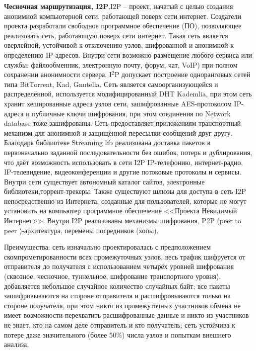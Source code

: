 \textbf{Чесночная маршрутизация, I2P}.I2P --  проект, начатый с целью создания анонимной компьютерной сети, работающей поверх сети интернет. Создатели проекта разработали свободное программное обеспечение (ПО), позволяющее реализовать сеть, работающую поверх сети интернет. Такая сеть является оверлейной, устойчивой к отключению узлов, шифрованной и анонимной к определению IP-адресов. Внутри сети возможно размещение любого сервиса или службы: файлообменник, электронную почту, форум, чат, VoIP) при полном сохранении анонимности сервера. I$ ^{2} $P допускает построение одноранговых сетей типа BitTorrent, Kad, Gnutella. %
Сеть является самоорганизующейся и распределённой, используется модифицированный DHT Kademlia, при этом сеть хранит хешированные адреса узлов сети, зашифрованные AES-протоколом IP-адреса и публичные ключи шифрования, при этом соединения по Network database тоже зашифрованы.	Сеть предоставляет приложениям транспортный механизм для анонимной и защищённой пересылки сообщений друг другу. %
Благодаря библиотеке Streaming lib реализована  доставка пакетов  в первоначально заданной последовательности без ошибок, потерь и дублирования, что даёт возможность использовать в сети I2P IP-телефонию, интернет-радио, IP-телевидение, видеоконференции и другие потоковые протоколы и сервисы. \cite{I2P1} %
Внутри сети  существует автономный каталог сайтов, электронные библиотеки,торрент-трекеры. Также существуют шлюзы для доступа в сеть I2P непосредственно из Интернета, созданные  для пользователей, которые  не могут установить на компьютер программное обеспечение <<Проекта Невидимый Интернет>>. Внутри I2P реализованы механизмы шифрования, P2P (peer to peer )-архитектура, перемены посредников (хопы).

Преимущества: сеть изначально проектировалась с предположением скомпрометированности  всех промежуточных узлов, \cite{I2P2} %
весь трафик шифруется от отправителя до получателя с использованием четырёх уровней шифрования (сквозное, чесночное, туннельное,  шифрование транспортного уровня), добавляется небольшое случайное количество случайных байт; все пакеты зашифровываются на стороне отправителя и расшифровываются только на стороне получателя, при этом никто из промежуточных участников обмена не имеет возможности перехватить расшифрованные данные и никто из участников не знает, кто на самом деле отправитель и кто получатель; сеть устойчива к потере даже значительного (более 50\%) числа узлов и попыткам внешнего анализа.

